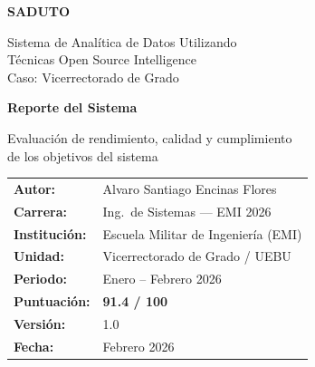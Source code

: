 \documentclass[11pt,a4paper]{article}
\begin{document}
\begin{titlepage}
\centering
\vspace*{2cm}

{\Huge\bfseries\color{emiblue}SADUTO\par}
\vspace{0.3cm}
{\large\color{emidark}Sistema de Analítica de Datos Utilizando\\Técnicas Open Source Intelligence\\Caso: Vicerrectorado de Grado\par}

\vspace{1cm}
\noindent\makebox[\textwidth]{\color{emiblue}\rule{0.6\textwidth}{2pt}}
\vspace{1cm}

{\LARGE\bfseries Reporte del Sistema\par}
\vspace{0.3cm}
{\large Evaluación de rendimiento, calidad y cumplimiento\\de los objetivos del sistema\par}

\vfill

\begin{tabular}{ll}
\textbf{Autor:}          & Alvaro Santiago Encinas Flores \\
\textbf{Carrera:}        & Ing.\ de Sistemas — EMI 2026 \\
\textbf{Institución:}    & Escuela Militar de Ingeniería (EMI) \\
\textbf{Unidad:}         & Vicerrectorado de Grado / UEBU \\
\textbf{Periodo:}        & Enero -- Febrero 2026 \\
\textbf{Puntuación:}     & \textbf{91.4 / 100} \\
\textbf{Versión:}        & 1.0 \\
\textbf{Fecha:}          & Febrero 2026 \\
\end{tabular}

\vspace{1cm}
\noindent\makebox[\textwidth]{\color{emiyellow}\rule{0.4\textwidth}{3pt}}
\end{titlepage}

\tableofcontents
\newpage

\end{document}
